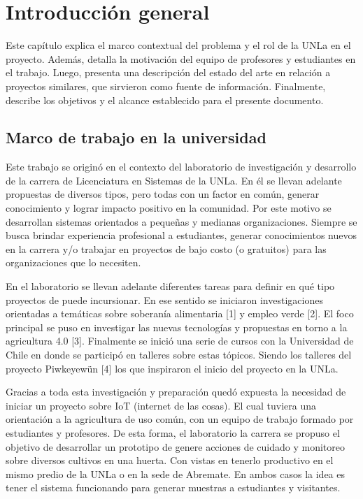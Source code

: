 \chapter{Introducción general} %

Este capítulo explica el marco contextual del problema y el rol de la UNLa en el proyecto. Además, detalla la motivación del equipo de profesores y estudiantes en el trabajo. Luego, presenta una descripción del estado del arte en relación a proyectos similares, que sirvieron como fuente de información. Finalmente, describe los objetivos y el alcance establecido para el presente documento.\\

\section{Marco de trabajo en la universidad}
Este trabajo se originó en el contexto del laboratorio de investigación y desarrollo de la carrera de Licenciatura en Sistemas de la UNLa. En él se llevan adelante propuestas de diversos tipos, pero todas con un factor en común, generar conocimiento y lograr impacto positivo en la comunidad. Por este motivo se desarrollan sistemas orientados a pequeñas y medianas organizaciones. Siempre se busca brindar experiencia profesional a estudiantes, generar conocimientos nuevos en la carrera y/o trabajar en proyectos de bajo costo (o gratuitos) para las organizaciones que lo necesiten.

En el laboratorio se llevan adelante diferentes tareas para definir en qué tipo proyectos de puede incursionar. En ese sentido se iniciaron investigaciones orientadas a temáticas sobre soberanía alimentaria [1] y empleo verde [2]. El foco principal se puso en investigar las nuevas tecnologías y propuestas en torno a la agricultura 4.0 [3]. Finalmente se inició una serie de cursos con la Universidad de Chile en donde se participó en talleres sobre estas tópicos. Siendo los talleres del proyecto Piwkeyewün [4] los que inspiraron el inicio del proyecto en la UNLa.

Gracias a toda esta investigación y preparación quedó expuesta la necesidad de iniciar un proyecto sobre IoT (internet de las cosas). El cual tuviera una orientación a la agricultura de uso común, con un equipo de trabajo formado por estudiantes y profesores. De esta forma, el laboratorio la carrera se propuso el objetivo de desarrollar un prototipo de genere acciones de cuidado y monitoreo sobre diversos cultivos en una huerta. Con vistas en tenerlo productivo en el mismo predio de la UNLa o en la sede de Abremate. En ambos casos la idea es tener el sistema funcionando para generar muestras a estudiantes y visitantes.

